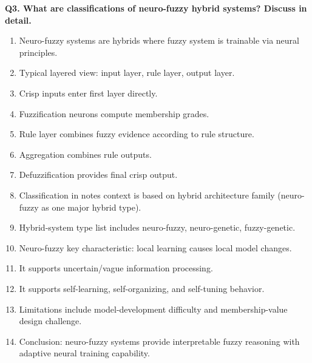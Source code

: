 \documentclass[11pt,a4paper]{article}
\begin{document}
\textbf{Q3. What are classifications of neuro-fuzzy hybrid systems? Discuss in detail.}
\begin{enumerate}
\item Neuro-fuzzy systems are hybrids where fuzzy system is trainable via neural principles.
\item Typical layered view: input layer, rule layer, output layer.
\item Crisp inputs enter first layer directly.
\item Fuzzification neurons compute membership grades.
\item Rule layer combines fuzzy evidence according to rule structure.
\item Aggregation combines rule outputs.
\item Defuzzification provides final crisp output.
\item Classification in notes context is based on hybrid architecture family (neuro-fuzzy as one major hybrid type).
\item Hybrid-system type list includes neuro-fuzzy, neuro-genetic, fuzzy-genetic.
\item Neuro-fuzzy key characteristic: local learning causes local model changes.
\item It supports uncertain/vague information processing.
\item It supports self-learning, self-organizing, and self-tuning behavior.
\item Limitations include model-development difficulty and membership-value design challenge.
\item Conclusion: neuro-fuzzy systems provide interpretable fuzzy reasoning with adaptive neural training capability.
\end{enumerate}
\end{document}
